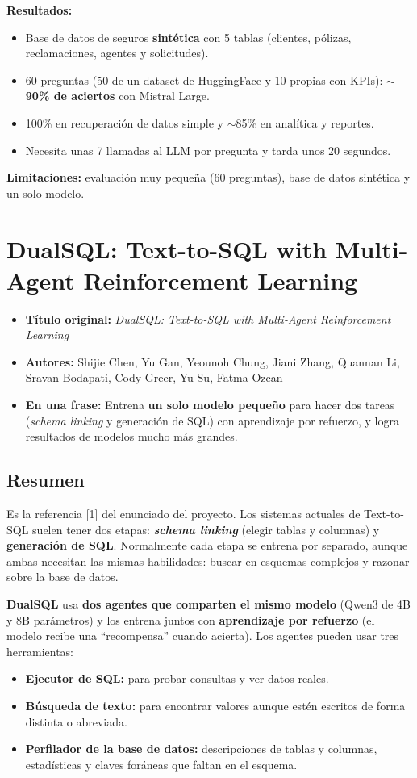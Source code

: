\documentclass[11pt,a4paper]{article}
\newcommand{\ficha}[5]{%
  \begin{itemize}[leftmargin=*, label={}]
    \item \textbf{Título original:} \textit{#1}
    \item \textbf{Autores:} #2
    \item \textbf{En una frase:} #5
  \end{itemize}
}
\begin{document}
\textbf{Resultados:}
\begin{itemize}
  \item Base de datos de seguros \textbf{sintética} con 5 tablas (clientes, pólizas, reclamaciones, agentes y solicitudes).
  \item 60 preguntas (50 de un dataset de HuggingFace y 10 propias con KPIs): \textbf{$\sim$90\% de aciertos} con Mistral Large.
  \item 100\% en recuperación de datos simple y $\sim$85\% en analítica y reportes.
  \item Necesita unas 7 llamadas al LLM por pregunta y tarda unos 20 segundos.
\end{itemize}

\textbf{Limitaciones:} evaluación muy pequeña (60 preguntas), base de datos sintética y un solo modelo.

\section{DualSQL: Text-to-SQL with Multi-Agent Reinforcement Learning}
\ficha
  {DualSQL: Text-to-SQL with Multi-Agent Reinforcement Learning}
  {Shijie Chen, Yu Gan, Yeounoh Chung, Jiani Zhang, Quannan Li, Sravan Bodapati, Cody Greer, Yu Su, Fatma Ozcan}
  {The Ohio State University y Google}
  {arXiv:2609.18135 (preprint), septiembre 2026}
  {Entrena \textbf{un solo modelo pequeño} para hacer dos tareas (\textit{schema linking} y generación de SQL) con aprendizaje por refuerzo, y logra resultados de modelos mucho más grandes.}

\subsection*{Resumen}
Es la referencia [1] del enunciado del proyecto. Los sistemas actuales de Text-to-SQL suelen tener dos etapas: \textbf{\textit{schema linking}} (elegir tablas y columnas) y \textbf{generación de SQL}. Normalmente cada etapa se entrena por separado, aunque ambas necesitan las mismas habilidades: buscar en esquemas complejos y razonar sobre la base de datos.

\textbf{DualSQL} usa \textbf{dos agentes que comparten el mismo modelo} (Qwen3 de 4B y 8B parámetros) y los entrena juntos con \textbf{aprendizaje por refuerzo} (el modelo recibe una ``recompensa'' cuando acierta). Los agentes pueden usar tres herramientas:
\begin{itemize}
  \item \textbf{Ejecutor de SQL:} para probar consultas y ver datos reales.
  \item \textbf{Búsqueda de texto:} para encontrar valores aunque estén escritos de forma distinta o abreviada.
  \item \textbf{Perfilador de la base de datos:} descripciones de tablas y columnas, estadísticas y claves foráneas que faltan en el esquema.
\end{itemize}
\end{document}
